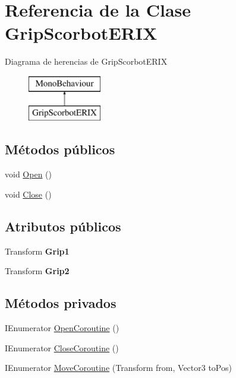 \hypertarget{class_grip_scorbot_e_r_i_x}{}\section{Referencia de la Clase Grip\+Scorbot\+E\+R\+IX}
\label{class_grip_scorbot_e_r_i_x}
Diagrama de herencias de Grip\+Scorbot\+E\+R\+IX\begin{figure}[H]
\begin{center}
\leavevmode
\includegraphics[height=2.000000cm]{class_grip_scorbot_e_r_i_x}
\end{center}
\end{figure}
\subsection*{Métodos públicos}
\begin{DoxyCompactItemize}
\item 
void \mbox{\hyperlink{class_grip_scorbot_e_r_i_x_a0c3b7287d1a56a1e7e00228a0dbe1a34}{Open}} ()
\item 
void \mbox{\hyperlink{class_grip_scorbot_e_r_i_x_a05f7c7720d01ab46bd5cd499b5f83646}{Close}} ()
\end{DoxyCompactItemize}
\subsection*{Atributos públicos}
\begin{DoxyCompactItemize}
\item 
\mbox{\label{class_grip_scorbot_e_r_i_x_a2facabd0fc50809175ecd2d6e5d96a23}} 
Transform {\bfseries Grip1}
\item 
\mbox{\label{class_grip_scorbot_e_r_i_x_adedacde16a4a9fb8a5ba5431a54beee4}} 
Transform {\bfseries Grip2}
\end{DoxyCompactItemize}
\subsection*{Métodos privados}
\begin{DoxyCompactItemize}
\item 
I\+Enumerator \mbox{\hyperlink{class_grip_scorbot_e_r_i_x_adbd6c8857d2023f488535dcb729a75d2}{Open\+Coroutine}} ()
\item 
I\+Enumerator \mbox{\hyperlink{class_grip_scorbot_e_r_i_x_a57a849f607ab9a3d606f8b2003f11ce1}{Close\+Coroutine}} ()
\item 
I\+Enumerator \mbox{\hyperlink{class_grip_scorbot_e_r_i_x_a96ea032a05d7c6e6099ed42619693557}{Move\+Coroutine}} (Transform from, Vector3 to\+Pos)
\end{DoxyCompactItemize}
